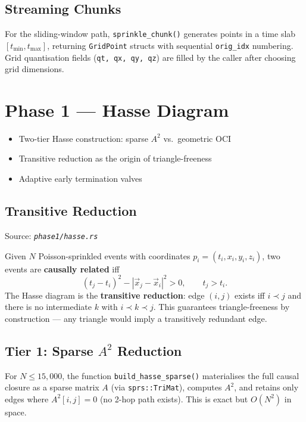 \documentclass[11pt, a4paper, openany]{book}
\newcommand{\code}[1]{\texttt{#1}}
\newcommand{\func}[1]{\texttt{\color{structure}#1}}
\newcommand{\file}[1]{\texttt{\itshape #1}}
\newenvironment{introduction}[1][Chapter Overview]{%
  \begin{tcolorbox}[
    enhanced,colback=structure!5,colframe=structure,
    colbacktitle=structure,coltitle=white,
    fonttitle=\small\bfseries,title={#1},
    arc=2pt,boxrule=0.7pt,
    left=8pt,right=8pt,top=6pt,bottom=6pt,
    before skip=12pt,after skip=12pt
  ]\itshape\begin{itemize}[leftmargin=*,itemsep=2pt,parsep=0pt]
}{%
  \end{itemize}\end{tcolorbox}
}
\begin{document}
\section{Streaming Chunks}

For the sliding-window path, \func{sprinkle\_chunk()} generates points in a
time slab $[t_{\min}, t_{\max}]$, returning \code{GridPoint} structs with
sequential \code{orig\_idx} numbering.  Grid quantisation fields
(\code{qt, qx, qy, qz}) are filled by the caller after choosing grid
dimensions.


\chapter{Phase 1 --- Hasse Diagram}

\begin{introduction}
  \item Two-tier Hasse construction: sparse $A^2$ vs.\ geometric OCI
  \item Transitive reduction as the origin of triangle-freeness
  \item Adaptive early termination valves
\end{introduction}

\section{Transitive Reduction}

Source: \file{phase1/hasse.rs}

Given $N$ Poisson-sprinkled events with coordinates $p_i = (t_i, x_i, y_i, z_i)$,
two events are \textbf{causally related} iff
\[
  (t_j - t_i)^2 - |\vec{x}_j - \vec{x}_i|^2 > 0, \qquad t_j > t_i.
\]
The Hasse diagram is the \textbf{transitive reduction}: edge $(i,j)$ exists iff
$i \prec j$ and there is no intermediate $k$ with $i \prec k \prec j$.  This
guarantees triangle-freeness by construction --- any triangle would imply a
transitively redundant edge.

\section{Tier 1: Sparse \texorpdfstring{$A^2$}{A²} Reduction}

For $N \leq 15{,}000$, the function \func{build\_hasse\_sparse()} materialises
the full causal closure as a sparse matrix $A$ (via \code{sprs::TriMat}),
computes $A^2$, and retains only edges where $A^2[i,j] = 0$ (no 2-hop path
exists).  This is exact but $O(N^2)$ in space.
\end{document}
